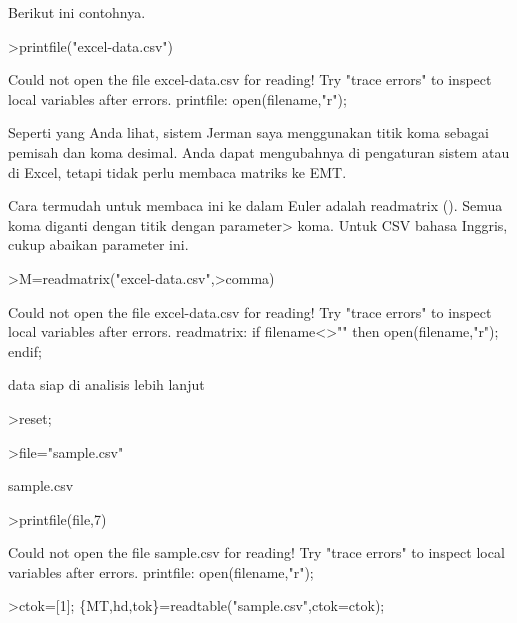 \documentclass[a4paper,10pt]{article}
\begin{document}
\begin{eulernotebook}
\begin{eulercomment}
\begin{eulercomment}
\begin{eulercomment}
\begin{eulercomment}
\begin{eulercomment}
\begin{eulercomment}
\begin{eulercomment}
\begin{eulercomment}
\begin{eulercomment}
\begin{eulercomment}
\begin{eulercomment}
Berikut ini contohnya.
\end{eulercomment}
\begin{eulerprompt}
>printfile("excel-data.csv")
\end{eulerprompt}
\begin{euleroutput}
  Could not open the file
  excel-data.csv
  for reading!
  Try "trace errors" to inspect local variables after errors.
  printfile:
      open(filename,"r");
\end{euleroutput}
\begin{eulercomment}
Seperti yang Anda lihat, sistem Jerman saya menggunakan titik koma
sebagai pemisah dan koma desimal. Anda dapat mengubahnya di pengaturan
sistem atau di Excel, tetapi tidak perlu membaca matriks ke EMT.

Cara termudah untuk membaca ini ke dalam Euler adalah readmatrix ().
Semua koma diganti dengan titik dengan parameter\textgreater{} koma. Untuk CSV
bahasa Inggris, cukup abaikan parameter ini.
\end{eulercomment}
\begin{eulerprompt}
>M=readmatrix("excel-data.csv",>comma)
\end{eulerprompt}
\begin{euleroutput}
  Could not open the file
  excel-data.csv
  for reading!
  Try "trace errors" to inspect local variables after errors.
  readmatrix:
      if filename<>"" then open(filename,"r"); endif;
\end{euleroutput}
\begin{eulercomment}
data siap di analisis lebih lanjut
\end{eulercomment}
\begin{eulerprompt}
>reset;
\end{eulerprompt}
\begin{eulerprompt}
>file="sample.csv"
\end{eulerprompt}
\begin{euleroutput}
  sample.csv
\end{euleroutput}
\begin{eulerprompt}
>printfile(file,7)
\end{eulerprompt}
\begin{euleroutput}
  Could not open the file
  sample.csv
  for reading!
  Try "trace errors" to inspect local variables after errors.
  printfile:
      open(filename,"r");
\end{euleroutput}
\begin{eulerprompt}
>ctok=[1]; \{MT,hd,tok\}=readtable("sample.csv",ctok=ctok);

\end{eulerprompt}
\end{eulercomment}
\end{eulercomment}
\end{eulercomment}
\end{eulercomment}
\end{eulercomment}
\end{eulercomment}
\end{eulercomment}
\end{eulercomment}
\end{eulercomment}
\end{eulercomment}
\end{eulernotebook}
\end{document}
